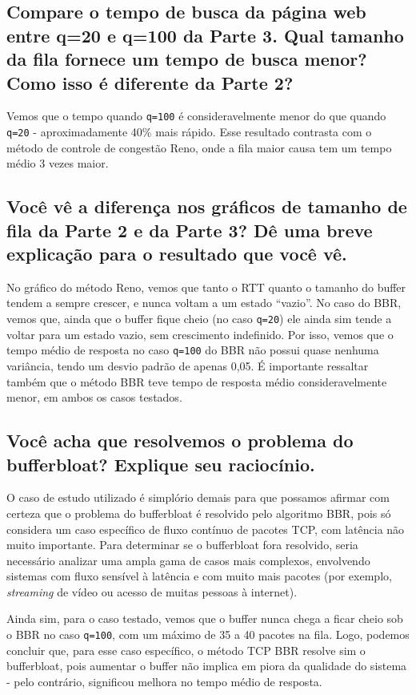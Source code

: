 \documentclass[a4paper,12pt]{article}
\newcommand{\code}[1]{\texttt{#1}}
\begin{document}
\subsection{Compare o tempo de busca da página web entre q=20 e q=100 da Parte 3. Qual tamanho da fila fornece um tempo de busca menor? Como isso é diferente da Parte 2?}

Vemos que o tempo quando \code{q=100} é consideravelmente menor do que quando \code{q=20} - aproximadamente 40\% mais rápido. Esse resultado contrasta com o método de controle de congestão Reno, onde a fila maior causa tem um tempo médio 3 vezes maior.

\subsection{Você vê a diferença nos gráficos de tamanho de fila da Parte 2 e da Parte 3? Dê uma breve explicação para o resultado que você vê.}

No gráfico do método Reno, vemos que tanto o RTT quanto o tamanho do buffer tendem a sempre crescer, e nunca voltam a um estado ``vazio''. No caso do BBR, vemos que, ainda que o buffer fique cheio (no caso \code{q=20}) ele ainda sim tende a voltar para um estado vazio, sem crescimento indefinido. Por isso, vemos que o tempo médio de resposta no caso \code{q=100} do BBR não possui quase nenhuma variância, tendo um desvio padrão de apenas 0,05. É importante ressaltar também que o método BBR teve tempo de resposta médio consideravelmente menor, em ambos os casos testados.

\subsection{Você acha que resolvemos o problema do bufferbloat? Explique seu raciocínio.}

O caso de estudo utilizado é simplório demais para que possamos afirmar com certeza que o problema do bufferbloat é resolvido pelo algoritmo BBR, pois só considera um caso específico de fluxo contínuo de pacotes TCP, com latência não muito importante. Para determinar se o bufferbloat fora resolvido, seria necessário analizar uma ampla gama de casos mais complexos, envolvendo sistemas com fluxo sensível à latência e com muito mais pacotes (por exemplo, \textit{streaming} de vídeo ou acesso de muitas pessoas à internet).

Ainda sim, para o caso testado, vemos que o buffer nunca chega a ficar cheio sob o BBR no caso \code{q=100}, com um máximo de 35 a 40 pacotes na fila. Logo, podemos concluir que, para esse caso específico, o método TCP BBR resolve sim o bufferbloat, pois aumentar o buffer não implica em piora da qualidade do sistema - pelo contrário, significou melhora no tempo médio de resposta.
\end{document}
